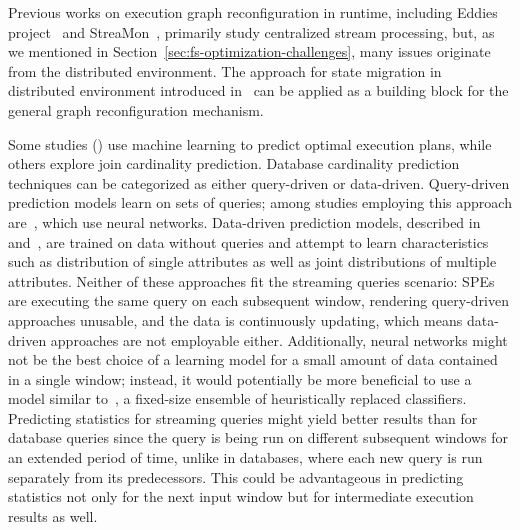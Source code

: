Previous works on execution graph reconfiguration in runtime, including Eddies project~\cite{10.1145/335191.335420} and StreaMon~\cite{10.1145/1007568.1007702}, primarily study centralized stream processing, but, as we mentioned in Section~\ref{sec:fs-optimization-challenges}, many issues originate from the distributed environment. The approach for state migration in distributed environment introduced in~\cite{10.14778/3329772.3329777} can be applied as a building block for the general graph reconfiguration mechanism.

Some studies (\cite{krishnan2018learning, marcus2019neo}) use machine learning to predict optimal execution plans, while others explore join cardinality prediction. Database cardinality prediction techniques can be categorized as either query-driven or data-driven. Query-driven prediction models learn on sets of queries; among studies employing this approach are~\cite{liu2015cardinality, CHEN20211047, kipf2018learned, ortiz2019empirical}, which use neural networks. Data-driven prediction models, described in~\cite{hilprecht2020deepdb} and~\cite{yang2020neurocard}, are trained on data without queries and attempt to learn characteristics such as distribution of single attributes as well as joint distributions of multiple attributes. Neither of these approaches fit the streaming queries scenario: SPEs are executing the same query on each subsequent window, rendering query-driven approaches unusable, and the data is continuously updating, which means data-driven approaches are not employable either. Additionally, neural networks might not be the best choice of a learning model for a small amount of data contained in a single window; instead, it would potentially be more beneficial to use a model similar to~\cite{street2001ensemble}, a fixed-size ensemble of heuristically replaced classifiers. Predicting statistics for streaming queries might yield better results than for database queries since the query is being run on different subsequent windows for an extended period of time, unlike in databases, where each new query is run separately from its predecessors. This could be advantageous in predicting statistics not only for the next input window but for intermediate execution results as well.




